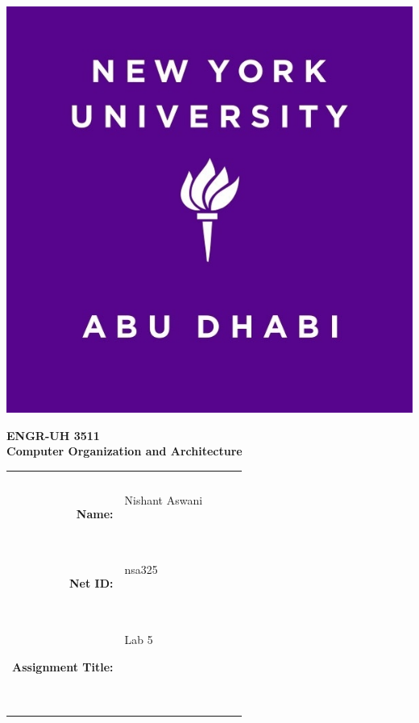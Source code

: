 \documentclass[twocolumn]{article}
\title{\myassignmenttitle}
\author{\myname, \myemail}
\affil{\myclassname (\mycoursenumber), Instructor \myinstructor}
\date{}
\newcommand{\myname}{Nishant Aswani}
\newcommand{\mynetid}{nsa325}
\newcommand{\myhwtype}{Lab }
\newcommand{\myhwnum}{5}
\newcommand{\mycoursenumber}{ENGR-UH 3511}
\newcommand{\myclassname}{Computer Organization and Architecture}
\begin{document}
\onecolumn
\pagestyle{fancy}
\fancyhf{}
\renewcommand{\headrulewidth}{0pt}

\begin{center}
  \includegraphics[scale=0.15]{etc/NYUAD-alt-logo.jpg}
\end{center}

{\vspace{2.5em}}

\begin{center}
    \Huge{\textbf{\mycoursenumber}}\\
    {\vspace{0.5em}}
    \Huge{\textbf{\myclassname}}
\end{center}

{\vspace{10em}}

\begin{center}
  \begin{tabular}{|rp{5.0cm}lll|}
    \hline
    &  &  &  & \\
    &  &  &  & \\
    \Large{\textbf{Name:}} & \Large{\myname}
    
    \  &  &  & \\
    \Large{\textbf{Net ID:}} & \Large{\mynetid}
    
    \  &  &  & \\
    \Large{\textbf{Assignment Title:}} & \Large{\myhwtype \myhwnum}
    
    \
    
    \  &  &  & \\
    \hline
  \end{tabular}
\end{center}
\end{document}
